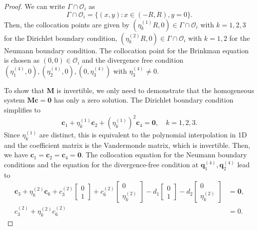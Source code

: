 \documentclass[10pt,a4paper]{amsart}
\newcommand{\bm}[1]{\boldsymbol{#1}}
\newcommand{\mc}[1]{\mathcal{#1}}
\begin{document}
\begin{proof}
We can write $\Gamma\cap \mc O_i$ as
\begin{equation}
    \Gamma\cap \mc O_i = \{(x,y):x\in (-R, R), y = 0\}.
\end{equation}
Then, the collocation points are given by $(\eta_k^{(1)} R, 0)\in \Gamma\cap \mc O_i$ with $k = 1,2,3$ for the Dirichlet boundary condition, $(\eta_k^{(2)} R, 0)\in \Gamma\cap \mc O_i$ with $k = 1,2$ for the Neumann boundary condition. The collocation point for the Brinkman equation is chosen as $(0, 0)\in \mc O_i$ and the divergence free condition $(\eta_1^{(4)}, 0), (\eta_2^{(4)}, 0), (0, \eta_3^{(4)})$ with $\eta_3^{(4)}\neq 0$.


To show that $\bm M$ is invertible, we only need to demonstrate that the homogeneous system $\bm M \bm c = \bm 0$ has only a zero solution.
The Dirichlet boundary condition simplifies to
\begin{equation}
    \bm c_1 + \eta_k^{(1)} \bm c_2 +  (\eta_k^{(1)} )^2\bm c_4 = \bm 0, \quad k = 1,2,3.
\end{equation}
Since $\eta_k^{(1)}$ are distinct, this is equivalent to the polynomial interpolation in 1D and the coefficient matrix is the Vandermonde matrix, which is invertible. Then, we have $\bm c_1 = \bm c_2 = \bm c_4 = \bm 0$. 
The collocation equation for the Neumann boundary conditions and the equation for the divergence-free condition at $\bm q_1^{(4)}, \bm q_2^{(4)}$ lead to
\begin{equation}
    \begin{aligned}
        \bm c_3 + \eta_k^{(2)}\bm c_6 + c_3^{(2)} 
        \begin{bmatrix}
            0\\
            1
        \end{bmatrix}
        + c_6^{(2)}
        \begin{bmatrix}
            0\\
            \eta_k^{(2)}
        \end{bmatrix}
        - d_1
        \begin{bmatrix}
            0\\
            1
        \end{bmatrix}
        -d_2
        \begin{bmatrix}
            0\\
            \eta_k^{(2)}
        \end{bmatrix} &= \bm 0, \\
    c_3^{(2)} + \eta_k^{(2)} c_6^{(2)} &= 0.

\end{aligned}
\end{equation}
\end{proof}
\end{document}
